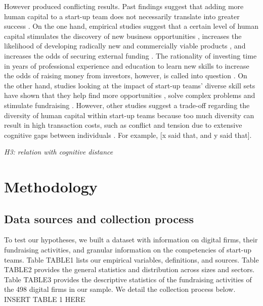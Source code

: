 \documentclass[12pt]{article}
\begin{document}
However produced conflicting results. Past findings suggest that adding more human capital to a start-up team does not necessarily translate into greater success \citep{pierce2013too}. On the one hand, empirical studies suggest that a certain level of human capital stimulates the discovery of new business opportunities \citep{shane2000promise, marvel2016human}, increases the likelihood of developing radically new and commercially viable products \citep{marvel2007technology}, and increases the odds of securing external funding \citep{beckman2007early}. The rationality of investing time in years of professional experience and education to learn new skills to increase the odds of raising money from investors, however, is called into question \citep{audretsch2004financing}. On the other hand, studies looking at the impact of start-up teams' diverse skill sets have shown that they help find more opportunities \citep{shane2000prior}, solve complex problems \citep{hong2001problem} and stimulate fundraising \citep{ko2018signaling}. However, other studies suggest a trade-off regarding the diversity of human capital within start-up teams because too much diversity can result in high transaction costs, such as conflict and tension due to extensive cognitive gaps between individuals \citep{nooteboom2007optimal}. For example, [x said that, and y said that].

\noindent \textit{H3: relation with cognitive distance}

\section{Methodology}

\subsection{Data sources and collection process}

To test our hypotheses, we built a dataset with information on digital firms, their fundraising activities, and granular information on the competencies of start-up teams. Table TABLE1 lists our empirical variables, definitions, and sources. Table TABLE2 provides the general statistics and distribution across sizes and sectors. Table TABLE3 provides the descriptive statistics of the fundraising activities of the 498 digital firms in our sample. We detail the collection process below. \\

INSERT TABLE 1 HERE \\
\end{document}

